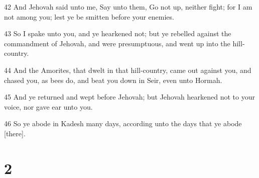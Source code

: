 \par 42 And Jehovah said unto me, Say unto them, Go not up, neither fight; for I am not among you; lest ye be smitten before your enemies.
\par 43 So I spake unto you, and ye hearkened not; but ye rebelled against the commandment of Jehovah, and were presumptuous, and went up into the hill-country.
\par 44 And the Amorites, that dwelt in that hill-country, came out against you, and chased you, as bees do, and beat you down in Seir, even unto Hormah.
\par 45 And ye returned and wept before Jehovah; but Jehovah hearkened not to your voice, nor gave ear unto you.
\par 46 So ye abode in Kadesh many days, according unto the days that ye abode [there].

\chapter{2}

